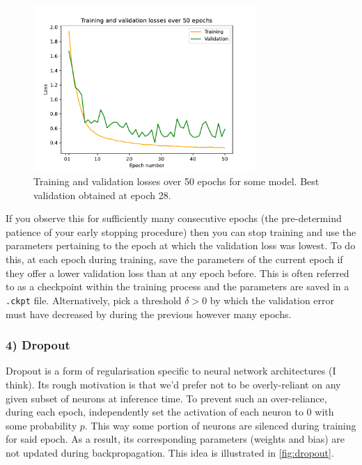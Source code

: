 \documentclass[11pt]{article}
\begin{document}
\begin{figure}[t]
    \centering
    \includegraphics[width=0.75\textwidth]{./figures/neural_nets/REG_early_stopping.pdf}
    \caption{Training and validation losses over 50 epochs for some model. Best validation obtained at epoch 28.}
    \label{fig:early_stopping}
\end{figure}

If you observe this for sufficiently many consecutive epochs (the pre-determind patience of your early stopping procedure) then you can stop training and use the parameters pertaining to the epoch at which the validation loss was lowest. To do this, at each epoch during training, save the parameters of the current epoch if they offer a lower validation loss than at any epoch before. This is often referred to as a checkpoint within the training process and the parameters are saved in a \texttt{.ckpt} file. Alternatively, pick a threshold $\delta>0$ by which the validation error must have decreased by during the previous however many epochs.

\subsubsection*{4) Dropout} Dropout is a form of regularisation specific to neural network architectures (I think). Its rough motivation is that we'd prefer not to be overly-reliant on any given subset of neurons at inference time. To prevent such an over-reliance, during each epoch, independently set the activation of each neuron to 0 with some probability $p$. This way some portion of neurons are silenced during training for said epoch. As a result, its corresponding parameters (weights and bias) are not updated during backpropagation. This idea is illustrated in \autoref{fig:dropout}.
\end{document}
